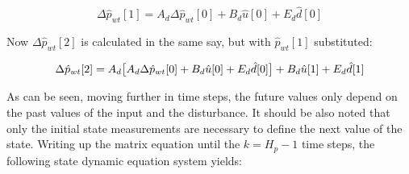 
\begin{equation}
	\Delta \hat p_{wt}[1] = A_d\Delta \hat p_{wt}[0] + B_d \hat u[0] + E_d \hat d[0]
\end{equation}

Now $\Delta \hat p_{wt}[2]$ is calculated in the same say, but with $\hat p_{wt}[1]$ substituted: 

\begin{equation}
	\Delta \hat p_{wt}[2] = A_d\big[A_d\Delta \hat p_{wt}[0] + B_d \hat u[0] + E_d \hat d[0]\big] + B_d \hat u[1] + E_d \hat d[1]\\ 
\end{equation}

As can be seen, moving further in time steps, the future values only depend on the past values of the input and the disturbance. It should be also noted that only the initial state measurements are necessary to define the next value of the state. Writing up the matrix equation until the $k = H_p - 1$ time steps, the following state dynamic equation system yields:

